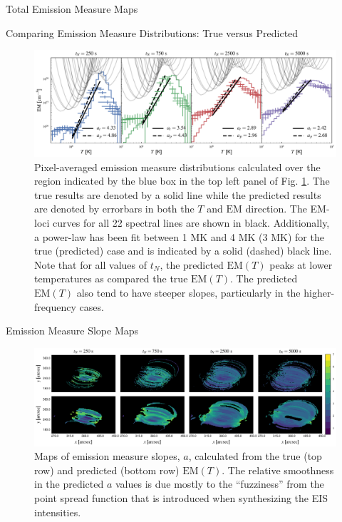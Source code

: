 \documentclass[final]{beamer}
\begin{document}
\begin{frame}
\begin{columns}[T]
\begin{column}{0.49\linewidth}
\begin{block}{Total Emission Measure Maps}
\begin{figure}
        \label{fig:total_em_map}
      \end{figure}
    \end{block}
    \begin{block}{Comparing Emission Measure Distributions: True versus Predicted}
      \begin{figure}
        \includegraphics[width=\columnwidth]{figures/em_1d_compare.pdf}
        \caption{Pixel-averaged emission measure distributions calculated over the region indicated by the blue box in the top left panel of Fig. \ref{fig:total_em_map}. The true results are denoted by a solid line while the predicted results are denoted by errorbars in both the $T$ and $\mathrm{EM}$ direction. The EM-loci curves for all 22 spectral lines are shown in black. Additionally, a power-law has been fit between 1 MK and 4 MK (3 MK) for the true (predicted) case and is indicated by a solid (dashed) black line. Note that for all values of $t_N$, the predicted $\mathrm{EM}(T)$ peaks at lower temperatures as compared the true $\mathrm{EM}(T)$. The predicted $\mathrm{EM}(T)$ also tend to have steeper slopes, particularly in the higher-frequency cases.}
        \label{fig:em_1d}
      \end{figure}
    \end{block}
    \begin{block}{Emission Measure Slope Maps}
      \begin{figure}
        \includegraphics[width=\columnwidth]{figures/em_slope_maps.pdf}
        \caption{Maps of emission measure slopes, $a$, calculated from the true (top row) and predicted (bottom row) $\mathrm{EM}(T)$. The relative smoothness in the predicted $a$ values is due mostly to the ``fuzziness'' from the point spread function that is introduced when synthesizing the EIS intensities.}

\end{figure}
\end{block}
\end{column}
\end{columns}
\end{frame}
\end{document}
